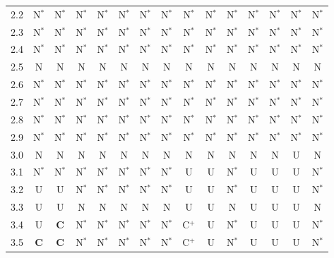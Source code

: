 {\begin{longtable}{lcccccccccccccc}
\rule[-3pt]{0pt}{11.5pt} 2.2 & N$^{*}$ & N$^{*}$ & N$^{*}$ & N$^{*}$ & N$^{*}$ & N$^{*}$ & N$^{*}$ & N$^{*}$ & N$^{*}$ & N$^{*}$ & N$^{*}$ & N$^{*}$ & N$^{*}$ & N$^{*}$ \\
\rule[-3pt]{0pt}{11.5pt} 2.3 & N$^{*}$ & N$^{*}$ & N$^{*}$ & N$^{*}$ & N$^{*}$ & N$^{*}$ & N$^{*}$ & N$^{*}$ & N$^{*}$ & N$^{*}$ & N$^{*}$ & N$^{*}$ & N$^{*}$ & N$^{*}$ \\
\rule[-3pt]{0pt}{11.5pt} 2.4 & N$^{*}$ & N$^{*}$ & N$^{*}$ & N$^{*}$ & N$^{*}$ & N$^{*}$ & N$^{*}$ & N$^{*}$ & N$^{*}$ & N$^{*}$ & N$^{*}$ & N$^{*}$ & N$^{*}$ & N$^{*}$ \\
\rule[-3pt]{0pt}{11.5pt} 2.5 & N & N & N & N & N & N & N & N & N & N & N & N & N & N \\
\rule[-3pt]{0pt}{11.5pt} 2.6 & N$^{*}$ & N$^{*}$ & N$^{*}$ & N$^{*}$ & N$^{*}$ & N$^{*}$ & N$^{*}$ & N$^{*}$ & N$^{*}$ & N$^{*}$ & N$^{*}$ & N$^{*}$ & N$^{*}$ & N$^{*}$ \\
\rule[-3pt]{0pt}{11.5pt} 2.7 & N$^{*}$ & N$^{*}$ & N$^{*}$ & N$^{*}$ & N$^{*}$ & N$^{*}$ & N$^{*}$ & N$^{*}$ & N$^{*}$ & N$^{*}$ & N$^{*}$ & N$^{*}$ & N$^{*}$ & N$^{*}$ \\
\rule[-3pt]{0pt}{11.5pt} 2.8 & N$^{*}$ & N$^{*}$ & N$^{*}$ & N$^{*}$ & N$^{*}$ & N$^{*}$ & N$^{*}$ & N$^{*}$ & N$^{*}$ & N$^{*}$ & N$^{*}$ & N$^{*}$ & N$^{*}$ & N$^{*}$ \\
\rule[-3pt]{0pt}{11.5pt} 2.9 & N$^{*}$ & N$^{*}$ & N$^{*}$ & N$^{*}$ & N$^{*}$ & N$^{*}$ & N$^{*}$ & N$^{*}$ & N$^{*}$ & N$^{*}$ & N$^{*}$ & N$^{*}$ & N$^{*}$ & N$^{*}$ \\
\rule[-3pt]{0pt}{11.5pt} 3.0 & N & N & N & N & N & N & N & N & N & N & N & N & U & N \\
\rule[-3pt]{0pt}{11.5pt} 3.1 & N$^{*}$ & N$^{*}$ & N$^{*}$ & N$^{*}$ & N$^{*}$ & N$^{*}$ & N$^{*}$ & U & U & N$^{*}$ & U & U & U & N$^{*}$ \\
\rule[-3pt]{0pt}{11.5pt} 3.2 & U & U & N$^{*}$ & N$^{*}$ & N$^{*}$ & N$^{*}$ & N$^{*}$ & U & U & N$^{*}$ & U & U & U & N$^{*}$ \\
\rule[-3pt]{0pt}{11.5pt} 3.3 & U & U & N & N & N & N & N & U & U & N & U & U & U & N \\
\rule[-3pt]{0pt}{11.5pt} 3.4 & U & \textbf{C} & N$^{*}$ & N$^{*}$ & N$^{*}$ & N$^{*}$ & N$^{*}$ & C$^{+}$ & U & N$^{*}$ & U & U & U & N$^{*}$ \\
\rule[-3pt]{0pt}{11.5pt} 3.5 & \textbf{C} & \textbf{C} & N$^{*}$ & N$^{*}$ & N$^{*}$ & N$^{*}$ & N$^{*}$ & C$^{+}$ & U & N$^{*}$ & U & U & U & N$^{*}$ \\
\bottomrule

\end{longtable}}
